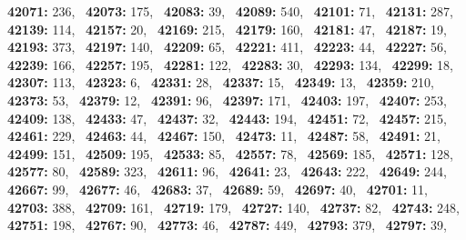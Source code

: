 \textbf{42071:} 236,\allowbreak~ 
\textbf{42073:} 175,\allowbreak~ 
\textbf{42083:} 39,\allowbreak~ 
\textbf{42089:} 540,\allowbreak~ 
\textbf{42101:} 71,\allowbreak~ 
\textbf{42131:} 287,\allowbreak~ 
\textbf{42139:} 114,\allowbreak~ 
\textbf{42157:} 20,\allowbreak~ 
\textbf{42169:} 215,\allowbreak~ 
\textbf{42179:} 160,\allowbreak~ 
\textbf{42181:} 47,\allowbreak~ 
\textbf{42187:} 19,\allowbreak~ 
\textbf{42193:} 373,\allowbreak~ 
\textbf{42197:} 140,\allowbreak~ 
\textbf{42209:} 65,\allowbreak~ 
\textbf{42221:} 411,\allowbreak~ 
\textbf{42223:} 44,\allowbreak~ 
\textbf{42227:} 56,\allowbreak~ 
\textbf{42239:} 166,\allowbreak~ 
\textbf{42257:} 195,\allowbreak~ 
\textbf{42281:} 122,\allowbreak~ 
\textbf{42283:} 30,\allowbreak~ 
\textbf{42293:} 134,\allowbreak~ 
\textbf{42299:} 18,\allowbreak~ 
\textbf{42307:} 113,\allowbreak~ 
\textbf{42323:} 6,\allowbreak~ 
\textbf{42331:} 28,\allowbreak~ 
\textbf{42337:} 15,\allowbreak~ 
\textbf{42349:} 13,\allowbreak~ 
\textbf{42359:} 210,\allowbreak~ 
\textbf{42373:} 53,\allowbreak~ 
\textbf{42379:} 12,\allowbreak~ 
\textbf{42391:} 96,\allowbreak~ 
\textbf{42397:} 171,\allowbreak~ 
\textbf{42403:} 197,\allowbreak~ 
\textbf{42407:} 253,\allowbreak~ 
\textbf{42409:} 138,\allowbreak~ 
\textbf{42433:} 47,\allowbreak~ 
\textbf{42437:} 32,\allowbreak~ 
\textbf{42443:} 194,\allowbreak~ 
\textbf{42451:} 72,\allowbreak~ 
\textbf{42457:} 215,\allowbreak~ 
\textbf{42461:} 229,\allowbreak~ 
\textbf{42463:} 44,\allowbreak~ 
\textbf{42467:} 150,\allowbreak~ 
\textbf{42473:} 11,\allowbreak~ 
\textbf{42487:} 58,\allowbreak~ 
\textbf{42491:} 21,\allowbreak~ 
\textbf{42499:} 151,\allowbreak~ 
\textbf{42509:} 195,\allowbreak~ 
\textbf{42533:} 85,\allowbreak~ 
\textbf{42557:} 78,\allowbreak~ 
\textbf{42569:} 185,\allowbreak~ 
\textbf{42571:} 128,\allowbreak~ 
\textbf{42577:} 80,\allowbreak~ 
\textbf{42589:} 323,\allowbreak~ 
\textbf{42611:} 96,\allowbreak~ 
\textbf{42641:} 23,\allowbreak~ 
\textbf{42643:} 222,\allowbreak~ 
\textbf{42649:} 244,\allowbreak~ 
\textbf{42667:} 99,\allowbreak~ 
\textbf{42677:} 46,\allowbreak~ 
\textbf{42683:} 37,\allowbreak~ 
\textbf{42689:} 59,\allowbreak~ 
\textbf{42697:} 40,\allowbreak~ 
\textbf{42701:} 11,\allowbreak~ 
\textbf{42703:} 388,\allowbreak~ 
\textbf{42709:} 161,\allowbreak~ 
\textbf{42719:} 179,\allowbreak~ 
\textbf{42727:} 140,\allowbreak~ 
\textbf{42737:} 82,\allowbreak~ 
\textbf{42743:} 248,\allowbreak~ 
\textbf{42751:} 198,\allowbreak~ 
\textbf{42767:} 90,\allowbreak~ 
\textbf{42773:} 46,\allowbreak~ 
\textbf{42787:} 449,\allowbreak~ 
\textbf{42793:} 379,\allowbreak~ 
\textbf{42797:} 39,\allowbreak~ 
